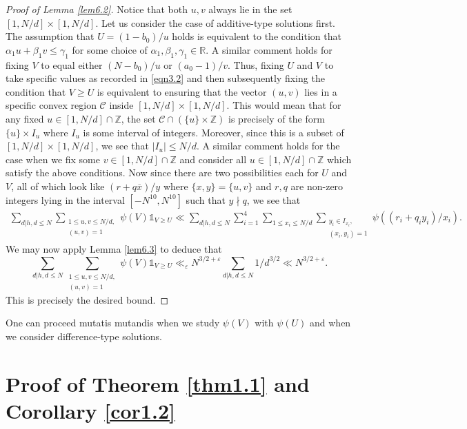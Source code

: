 \documentclass[12pt,reqno]{amsart}
\theoremstyle{definition}
\theoremstyle{remark}
\numberwithin{equation}{section}
\renewcommand{\geq}{\geqslant}
\renewcommand{\leq}{\leqslant}
\def\eps{\varepsilon}
\def \cC {\mathcal C}
\newcommand\1{\mathds{1}}
\begin{document}
\begin{proof}[Proof of Lemma \ref{lem6.2}]
Notice that both $u,v$ always lie in the set $[1, N/d] \times [1,N/d]$. Let us consider the case of additive-type solutions first. The assumption that $U = (1 - b_0)/u$ holds is equivalent to the condition that $\alpha_1 u + \beta_1 v \leq \gamma_1$ for some choice of $\alpha_1, \beta_1, \gamma_1 \in \mathbb{R}$. A similar comment holds for fixing $V$ to equal either $(N- b_0)/u$ or $(a_0 - 1)/v$. Thus, fixing $U$ and $V$ to take specific values as recorded in \eqref{eqn3.2} and then subsequently fixing the condition that $V \geq U$ is equivalent to ensuring that the vector $(u,v)$ lies in a specific convex region $\cC$ inside  $[1, N/d] \times [1,N/d]$. This would mean that for any fixed $u \in  [1,N/d] \cap \mathbb{Z}$, the set $\cC \cap( \{u\} \times \mathbb{Z})$ is precisely of the form $\{u\} \times I_u$ where $I_u$ is some interval of integers. Moreover, since this is a subset of $[1, N/d] \times [1,N/d]$, we see that $|I_u| \leq N/d$. A similar comment holds for the case when we fix some $v \in [1,N/d] \cap \mathbb{Z}$ and consider all $u \in [1,N/d] \cap \mathbb{Z}$ which satisfy the above conditions. Now since there are two possibilities each for $U$ and $V$, all of which look like $(r + q\overline{x})/y$ where $\{x,y\} = \{ u, v\}$ and $r,q$ are non-zero integers lying in the interval $[-N^{10},N^{10}]$ such that $y \nmid q$, we see that
\begin{align*}
    \sum_{d|h, d \leq N} \sum_{\substack{1 \leq u, v \leq N/d, \\ (u,v) = 1}}\psi(V) \1_{V \geq U} \ll \sum_{d|h, d \leq N} \sum_{i=1}^4 \sum_{1 \leq x_i \leq N/d} \sum_{\substack{ y_i \in I_{x_i}, \\ (x_i,y_i) = 1}} \psi((r_i+q_i y_i)/x_i)  .
\end{align*}
We may now apply Lemma \ref{lem6.3} to deduce that
\[ \sum_{d|h, d \leq N} \sum_{\substack{1 \leq u, v \leq N/d, \\ (u,v) = 1}}\psi(V) \1_{V \geq U} \ll_{\eps} N^{3/2 + \eps} \sum_{d|h, d \leq N} 1/d^{3/2} \ll N^{3/2 + \eps}. \]
This is precisely the desired bound. 
\end{proof}

One can proceed mutatis mutandis when we study $\psi(V)$ with $\psi(U)$ and when we consider difference-type solutions.

\section{Proof of Theorem \ref{thm1.1} and Corollary \ref{cor1.2}} \label{sec7}
\end{document}
